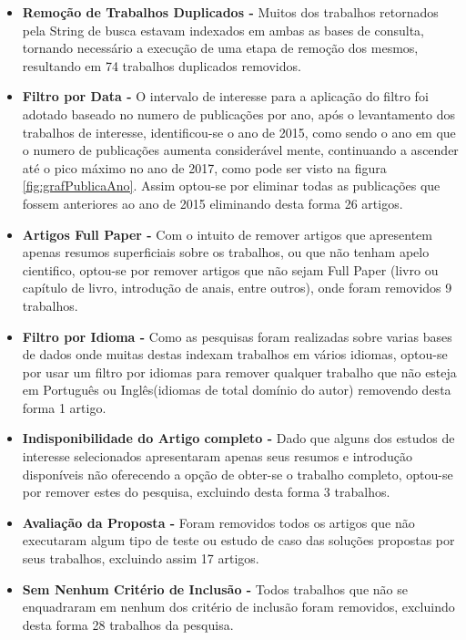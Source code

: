 \documentclass[tid,table]{texufpel} %
\begin{document}
\begin{itemize}
	\item  \textbf{Remoção de Trabalhos Duplicados - } Muitos dos trabalhos retornados pela String de busca estavam indexados em ambas as bases de consulta, tornando necessário a execução de uma etapa de remoção dos mesmos, resultando em 74 trabalhos duplicados removidos.
	
	\item  \textbf{Filtro por Data - } O intervalo de interesse para a aplicação do filtro foi adotado baseado no numero de publicações por ano, após o levantamento dos trabalhos de interesse, identificou-se o ano de 2015, como sendo o ano em que o numero de publicações aumenta considerável mente, continuando a ascender até o pico máximo no ano de 2017, como pode ser visto na figura \ref{fig:grafPublicaAno}. Assim optou-se por eliminar todas as publicações que fossem anteriores ao ano de 2015 eliminando desta forma 26 artigos.	
	
	\item  \textbf{Artigos Full Paper - } Com o intuito de remover artigos que apresentem apenas resumos superficiais sobre os trabalhos, ou que não tenham apelo cientifico, optou-se por remover artigos que não sejam Full Paper (livro ou capítulo de livro, introdução de anais, entre outros), onde foram removidos 9 trabalhos.
	
	\item  \textbf{Filtro por Idioma - } Como as pesquisas foram realizadas sobre varias bases de dados onde muitas destas indexam trabalhos em vários idiomas, optou-se por usar um filtro por idiomas para remover qualquer trabalho que não esteja em Português ou Inglês(idiomas de total domínio do autor) removendo desta forma 1 artigo.
	
	\item  \textbf{Indisponibilidade do Artigo completo - } Dado que alguns dos estudos de interesse selecionados apresentaram apenas seus resumos e introdução disponíveis não oferecendo a opção de obter-se o trabalho completo, optou-se por remover estes do pesquisa, excluindo desta forma 3 trabalhos.
	
	\item  \textbf{Avaliação da Proposta - } Foram removidos todos os artigos que não executaram algum tipo de teste ou estudo de caso das soluções propostas por seus trabalhos, excluindo assim 17 artigos.
	
	\item  \textbf{Sem Nenhum Critério de Inclusão - } Todos trabalhos que não  se enquadraram em nenhum dos critério de inclusão foram removidos, excluindo desta forma 28 trabalhos da pesquisa.	

\end{itemize}
\end{document}
